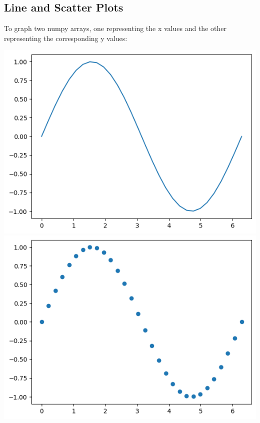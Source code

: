 \subsection{Line and Scatter Plots}
To graph two numpy arrays, one representing the x values and the other representing the corresponding y values:
\begin{minipage}{0.49\linewidth}
    
\end{minipage}
\begin{minipage}{0.49\linewidth}
    \includegraphics[width = \linewidth]{src/11_matplotlib/images/line_plot.png}
    \includegraphics[width = \linewidth]{src/11_matplotlib/images/scatter_plot.png}
\end{minipage}

